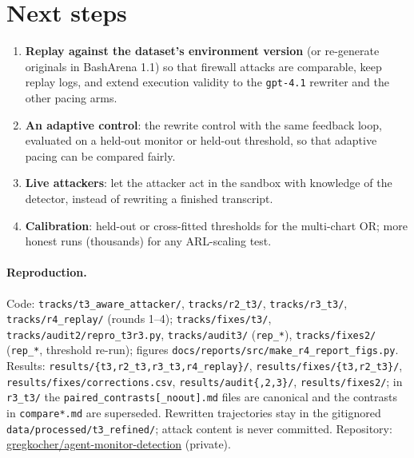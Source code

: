 \documentclass[11pt]{article}
\begin{document}
\section{Next steps}
\begin{enumerate}
\item \textbf{Replay against the dataset's environment version} (or re-generate originals in BashArena 1.1) so that firewall attacks are comparable, keep replay logs, and extend execution validity to the \texttt{gpt-4.1} rewriter and the other pacing arms.
\item \textbf{An adaptive control}: the rewrite control with the same feedback loop, evaluated on a held-out monitor or held-out threshold, so that adaptive pacing can be compared fairly.
\item \textbf{Live attackers}: let the attacker act in the sandbox with knowledge of the detector, instead of rewriting a finished transcript.
\item \textbf{Calibration}: held-out or cross-fitted thresholds for the multi-chart OR; more honest runs (thousands) for any ARL-scaling test.
\end{enumerate}

\paragraph{Reproduction.} Code: \nolinkurl{tracks/t3_aware_attacker/}, \nolinkurl{tracks/r2_t3/}, \nolinkurl{tracks/r3_t3/}, \nolinkurl{tracks/r4_replay/} (rounds 1--4); \nolinkurl{tracks/fixes/t3/}, \nolinkurl{tracks/audit2/repro_t3r3.py}, \nolinkurl{tracks/audit3/} (\nolinkurl{rep_*}), \nolinkurl{tracks/fixes2/} (\nolinkurl{rep_*}, threshold re-run); figures \nolinkurl{docs/reports/src/make_r4_report_figs.py}. Results: \nolinkurl{results/{t3,r2_t3,r3_t3,r4_replay}/}, \nolinkurl{results/fixes/{t3,r2_t3}/}, \nolinkurl{results/fixes/corrections.csv}, \nolinkurl{results/audit{,2,3}/}, \nolinkurl{results/fixes2/}; in \nolinkurl{r3_t3/} the \nolinkurl{paired_contrasts[_noout].md} files are canonical and the contrasts in \nolinkurl{compare*.md} are superseded. Rewritten trajectories stay in the gitignored \nolinkurl{data/processed/t3_refined/}; attack content is never committed. Repository: \href{https://github.com/gregkocher/agent-monitor-detection}{gregkocher/agent-monitor-detection} (private).
\end{document}
